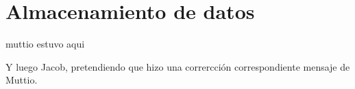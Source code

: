 \chapter{Almacenamiento de datos }

muttio estuvo aqui

Y luego Jacob, pretendiendo que hizo una corrercción correspondiente mensaje de Muttio. 
